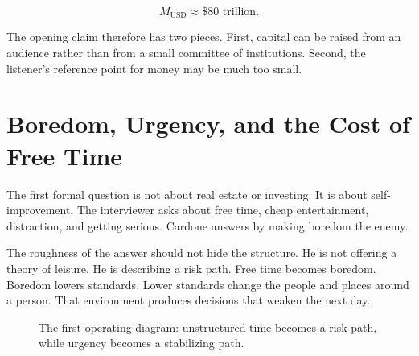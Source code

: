 \begin{equation}
M_{\mathrm{USD}} \approx \$80\text{ trillion}.
\end{equation}

The opening claim therefore has two pieces. First, capital can be raised from an audience rather than from a small committee of institutions. Second, the listener's reference point for money may be much too small.

\section{Boredom, Urgency, and the Cost of Free Time}

The first formal question is not about real estate or investing. It is about self-improvement. The interviewer asks about free time, cheap entertainment, distraction, and getting serious. Cardone answers by making boredom the enemy.

The roughness of the answer should not hide the structure. He is not offering a theory of leisure. He is describing a risk path. Free time becomes boredom. Boredom lowers standards. Lower standards change the people and places around a person. That environment produces decisions that weaken the next day.

\begin{figure}
\centering
{}
\caption{The first operating diagram: unstructured time becomes a risk path, while urgency becomes a stabilizing path.}
\end{figure}

